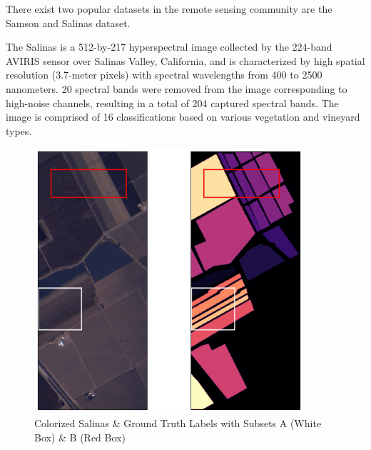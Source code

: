 There exist two popular datasets in the remote sensing community are the Samson and Salinas dataset. 

The Salinas is a 512-by-217 hyperspectral image collected by the 224-band AVIRIS sensor over Salinas Valley, California, and is characterized by high spatial resolution (3.7-meter pixels) with spectral wavelengths from 400 to 2500 nanometers. 20 spectral bands were removed from the image corresponding to high-noise channels, resulting in a total of 204 captured spectral bands. The image is comprised of 16 classifications based on various vegetation and vineyard types.
\begin{figure}[H]
    \centering
    \includegraphics[width=10cm]{salinas_overview.png}  %
    \caption{Colorized Salinas \& Ground Truth Labels with Subsets A (White Box) \& B (Red Box)}
    \label{salinas-borders}  %
  \end{figure}

